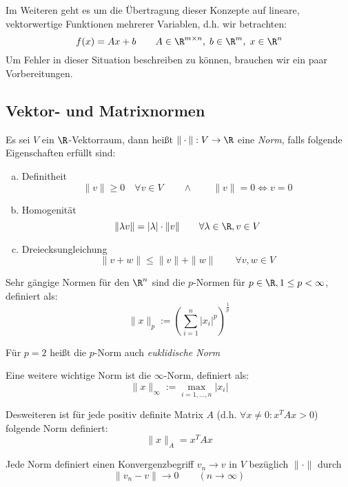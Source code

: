 \documentclass[a4paper]{scrartcl}
\numberwithin{equation}{section}
\begin{document}
Im Weiteren geht es um die Übertragung dieser Konzepte auf lineare, vektorwertige Funktionen mehrerer Variablen, d.h. wir betrachten:
\[
f(x)=Ax+b \qquad A\in\R^{m\times n},\; b\in\R^m,\; x\in\R^n
\]
Um Fehler in dieser Situation beschreiben zu können, brauchen wir ein paar Vorbereitungen.

\subsection{Vektor- und Matrixnormen}

\begin{df}
\label{df:2.7}
Es sei $V$ ein $\R$-Vektorraum, dann heißt $\|\cdot\|:V\to \R$ eine \emph{Norm}, falls folgende Eigenschaften erfüllt sind:
\begin{enumerate}[(a)]
\item Definitheit
	\[
		\|v\|\ge 0 \quad \forall v\in V \qquad \land \qquad \|v\|=0\iff v=0
	\]
\item Homogenität
	\[
		\|\lambda v\|=|\lambda|\cdot \|v\| \qquad \forall\lambda\in\R,v\in V
	\]
\item Dreiecksungleichung 
	\[
		\|v+w\|\le\|v\|+\|w\| \qquad \forall v,w\in V
	\]
\end{enumerate}
\end{df}

\begin{ex}[$p$-Norm]
	\label{ex:2.8}
	Sehr gängige Normen für den $\R^n$ sind die $p$-Normen für $p\in\R, 1\le p<\infty$, definiert als:
	\[
	\|x\|_p := \left(\sum_{i=1}^n\left|x_i\right|^p\right)^{\frac 1p}
	\]
	\begin{note}
		Für $p=2$ heißt die $p$-Norm auch \emph{euklidische Norm}
	\end{note}
\end{ex}
\begin{ex*}
	Eine weitere wichtige Norm ist die $\infty$-Norm, definiert als:
	\[
	\|x\|_\infty := \max_{i=1,\dotsc,n}|x_i|
	\]
\end{ex*}
\begin{ex*}
	Desweiteren ist für jede positiv definite Matrix $A$ (d.h. $\forall x\neq 0:x^TAx > 0$) folgende Norm definiert:
	\[
		\|x\|_A = x^TAx
	\]
\end{ex*}

Jede Norm definiert einen Konvergenzbegriff $v_n\to v$ in $V$ bezüglich $\|\cdot\|$ durch
\[
\|v_n-v\|\to 0 \qquad (n\to\infty)
\]
\end{document}
